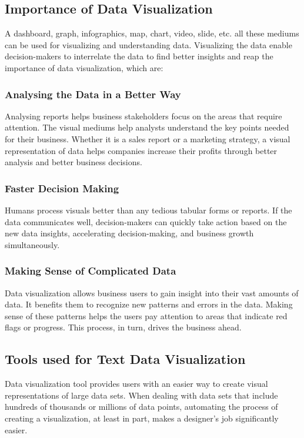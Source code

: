 \documentclass[a4paper,12pt]{report}
\begin{document}
    \subsection{Importance of Data Visualization}
    A dashboard, graph, infographics, map, chart, video, slide, etc. all these mediums can be used for visualizing and understanding data. Visualizing the data enable decision-makers to interrelate the data to find better insights and reap the importance of data visualization, which are:
    \subsubsection{Analysing the Data in a Better Way}
    Analysing reports helps business stakeholders focus on the areas that require attention. The visual mediums help analysts understand the key points needed for their business. Whether it is a sales report or a marketing strategy, a visual representation of data helps companies increase their profits through better analysis and better business decisions.
    \subsubsection{Faster Decision Making}
    Humans process visuals better than any tedious tabular forms or reports. If the data communicates well, decision-makers can quickly take action based on the new data insights, accelerating decision-making, and business growth simultaneously.
    \subsubsection{Making Sense of Complicated Data}
    Data visualization allows business users to gain insight into their vast amounts of data. It benefits them to recognize new patterns and errors in the data. Making sense of these patterns helps the users pay attention to areas that indicate red flags or progress. This process, in turn, drives the business ahead.

    \subsection{Tools used for Text Data Visualization}
    Data visualization tool provides users with an easier way to create visual representations of large data sets. When dealing with data sets that include hundreds of thousands or millions of data points, automating the process of creating a visualization, at least in part, makes a designer’s job significantly easier.
\end{document}
